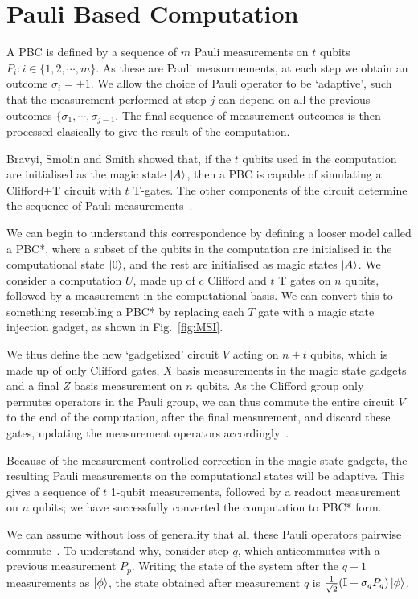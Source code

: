 \documentclass{standalone}
\begin{document}
\section{Pauli Based Computation}\label{sec:pbc}
A PBC is defined by a sequence of $m$ Pauli measurements on $t$ qubits $P_{i}:i\in\{1,2,\cdots,m\}$. As these are Pauli measurmements, at each step we obtain an outcome $\sigma_{i}=\pm 1$. We allow the choice of Pauli operator to be `adaptive', such that the measurement performed at step $j$ can depend on all the previous outcomes $\{\sigma_{1},\cdots,\sigma_{j-1}$. The final sequence of measurement outcomes is then processed clasically to give the result of the computation. 
\par
Bravyi, Smolin and Smith showed that, if the $t$ qubits used in the computation are initialised as the magic state $\ket{A}$, then a PBC is capable of simulating a Clifford+T circuit with $t$ T-gates. The other components of the circuit determine the sequence of Pauli measurements~\cite{Bravyi2015}. 
\par
We can begin to understand this correspondence by defining a looser model called a PBC*, where a subset of the qubits in the computation are initialised in the computational state $\ket{0}$, and the rest are initialised as magic states $\ket{A}$. We consider a computation $U$, made up of $c$ Clifford and $t$ T gates on $n$ qubits, followed by a measurement in the computational basis. We can convert this to something resembling a PBC* by replacing each $T$ gate with a magic state injection gadget, as shown in Fig.~\ref{fig:MSI}. 
\par
We thus define the new `gadgetized' circuit $V$ acting on $n+t$ qubits, which is made up of only Clifford gates, $X$ basis measurements in the magic state gadgets and a final $Z$ basis measurement on $n$ qubits. As the Clifford group only permutes operators in the Pauli group, we can thus commute the entire circuit $V$ to the end of the computation, after the final measurement, and discard these gates, updating the measurement operators accordingly~\cite{Bravyi2015}. 
\par
Because of the measurement-controlled correction in the magic state gadgets, the resulting Pauli measurements on the computational states will be adaptive. This gives a sequence of $t$ 1-qubit measurements, followed by a readout measurement on $n$ qubits; we have successfully converted the computation to PBC* form. 
\par
We can assume without loss of generality that all these Pauli operators pairwise commute~\cite{Bravyi2015}. To understand why, consider step $q$, which anticommutes with a previous measurement $P_{p}$. Writing the state of the system after the $q-1$ measurements as $\ket{\phi}$, the state obtained after measurement $q$ is $\frac{1}{\sqrt{2}}(\mathbb{I}+\sigma_{q}P_{q})\ket{\phi}$.
\end{document}
